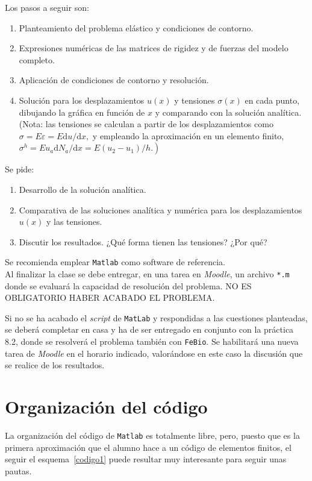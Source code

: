 Los pasos a seguir son:
\begin{enumerate}
\item Planteamiento del problema elástico y condiciones de contorno.
\item Expresiones numéricas de las matrices de rigidez y de fuerzas del modelo completo.
\item Aplicación de condiciones de contorno y resolución.
\item Solución para los desplazamientos \(u(x)\) y tensiones \(\sigma(x)\) en cada punto, dibujando la gráfica en función de \(x\) y comparando con la solución analítica. (Nota: las tensiones se calculan
a partir de los desplazamientos como \(\sigma=E \varepsilon=E \mathrm{d} u / \mathrm{d} x,\) y empleando la aproximación
en un elemento finito, \(\left.\sigma^{h}=E u_{a} \mathrm{d} N_{a} / \mathrm{d} x=E\left(u_{2}-u_{1}\right) / h .\right)\)
\end{enumerate}

Se pide:
\begin{enumerate}
\item  Desarrollo de la solución analítica.
\item Comparativa de las soluciones analítica y numérica para los desplazamientos \(u(x)\) y las tensiones.
\item Discutir los resultados. ¿Qué forma tienen las tensiones? ¿Por qué?
\end{enumerate}

Se recomienda emplear \texttt{Matlab} como software de referencia.\\

Al finalizar la clase se debe entregar, en una tarea en \emph{Moodle}, un archivo  \texttt{*.m} donde se evaluará la capacidad de resolución del problema. NO ES OBLIGATORIO HABER ACABADO EL PROBLEMA.


Si no se ha acabado el \emph{script} de \texttt{MatLab} y respondidas a las cuestiones planteadas, se deberá completar en casa y ha de ser entregado en conjunto con la práctica 8.2, donde se resolverá el problema también con \texttt{FeBio}. Se habilitará una nueva tarea de \emph{Moodle} en el horario indicado, valorándose en este caso la discusión que se realice de los resultados.

\section{Organización del código }
\label{sec:esq}

La organización del código de \texttt{Matlab} es totalmente libre, pero, puesto que es la primera aproximación que el alumno hace a un código de elementos finitos, el seguir el esquema~\ref{codigo1} puede resultar muy interesante para seguir unas pautas.

